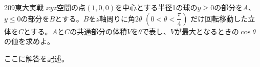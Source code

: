 \begin{thm}{209}{}{東大実戦}
 $xyz$空間の点$(1,0,0)$を中心とする半径1の球の$y\ge 0$の部分を$A$、$y\le 0$の部分を$B$とする。$B$を$z$軸周りに角$2\theta$ $(0<\theta<\dfrac{\pi}{4})$ だけ回転移動した立体を$C$とする。$A$と$C$の共通部分の体積$V$を$\theta$で表し、$V$が最大となるときの$\cos\theta$の値を求めよ。
\end{thm}

ここに解答を記述。
